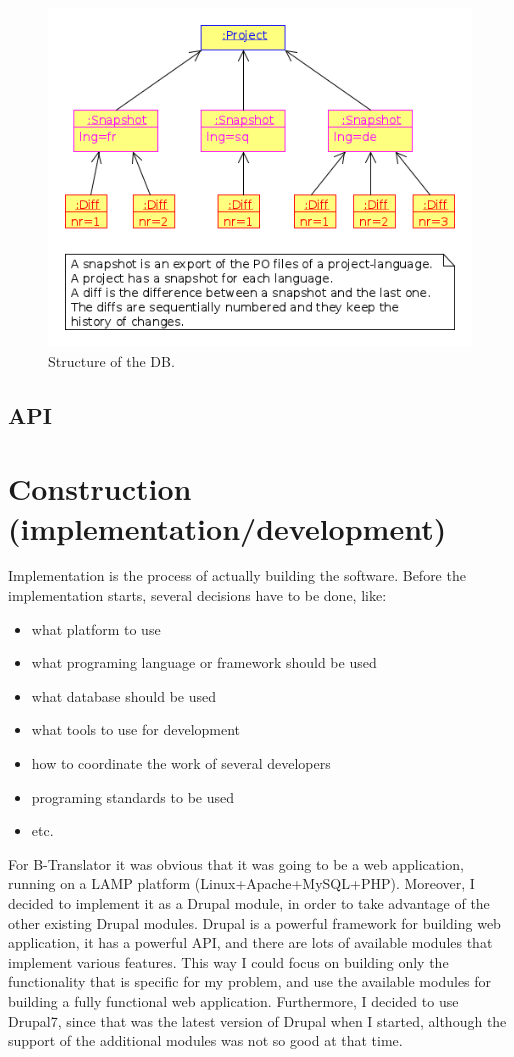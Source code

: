 \documentclass[11pt]{article}
\begin{document}
   \begin{figure}[htb]
\centering
\includegraphics[width=12cm]{./uml/object_diagram_3.png}
\caption{\label{fig:object_diagram_3}Structure of the DB.}
\end{figure}


\subsection{API}
\label{sec-5.2}



\section{Construction (implementation/development)}
\label{sec-6}


  Implementation is the process of actually building the software.
  Before the implementation starts, several decisions have to be done, like:
\begin{itemize}
\item what platform to use
\item what programing language or framework should be used
\item what database should be used
\item what tools to use for development
\item how to coordinate the work of several developers
\item programing standards to be used
\item etc.
\end{itemize}
  For B-Translator it was obvious that it was going to be a web
  application, running on a LAMP platform (Linux+Apache+MySQL+PHP).
  Moreover, I decided to implement it as a Drupal module, in order to
  take advantage of the other existing Drupal modules. Drupal is a
  powerful framework for building web application, it has a powerful
  API, and there are lots of available modules that implement various
  features. This way I could focus on building only the functionality
  that is specific for my problem, and use the available modules for
  building a fully functional web application. Furthermore, I decided
  to use Drupal7, since that was the latest version of Drupal when I
  started, although the support of the additional modules was not so
  good at that time.
\end{document}
